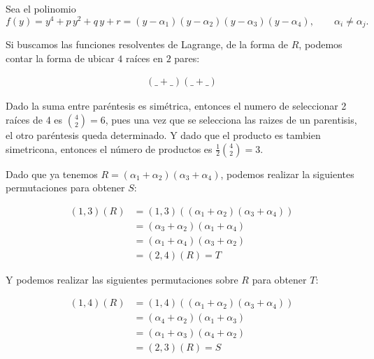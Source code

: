 \begin{solution}

  Sea el polinomio
  \[
  f(y)=y^{4}+p\,y^{2}+q\,y+r
        =(y-\alpha_{1})(y-\alpha_{2})(y-\alpha_{3})(y-\alpha_{4}),
        \qquad \alpha_i\neq\alpha_j .
  \]

  Si buscamos las funciones resolventes de Lagrange, de la forma de $R$, podemos contar la forma de ubicar $4$ raíces en $2$ pares:

  \begin{align*}
    (\_ + \_)(\_ + \_)
  \end{align*}

  
  Dado la suma entre paréntesis es simétrica, entonces el numero de seleccionar 2 raíces de 4 es $\binom{4}{2} = 6$, pues una vez que se selecciona las raizes de un parentisis, el otro paréntesis queda determinado. Y dado que el producto es tambien simetricona, entonces el número de productos es $\frac 12\binom{4}{2} = 3$.

  Dado que ya tenemos $R = (\alpha_{1}+\alpha_{2})(\alpha_{3}+\alpha_{4})$, podemos realizar la siguientes permutaciones para obtener $S$:

  \begin{align*}
    (1,3)(R) 
    &= (1,3)((\alpha_1 + \alpha_2)(\alpha_3 + \alpha_4))\\
    &= (\alpha_3 + \alpha_2)(\alpha_1+\alpha_4)\\
    &=(\alpha_1 + \alpha_4)(\alpha_3 + \alpha_2)\\
    &=(2,4)(R) = T
  \end{align*}

  Y podemos realizar las siguientes permutaciones sobre $R$ para obtener $T$:

  \begin{align*}
    (1,4)(R) 
    &= (1,4)((\alpha_1 + \alpha_2)(\alpha_3 + \alpha_4))\\
    &= (\alpha_4 + \alpha_2)(\alpha_1+\alpha_3)\\
    &=(\alpha_1 + \alpha_3)(\alpha_4 + \alpha_2)\\
    &=(2,3)(R) = S
  \end{align*}
  


  

\end{solution}

